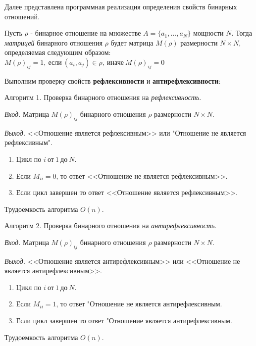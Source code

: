 \documentclass[bachelor, och, labwork]{shiza}
\begin{document}
Далее представлена программная реализация определения свойств бинарных 
отношений.

Пусть $\rho$ - бинарное отношение на множестве $A=\{a_1,...,a_N\}$ мощности $N$.
Тогда \textit{матрицей} бинарного отношения $\rho$ будет матрица $M(\rho)$ 
размерности $N \times N$, определяемая следующим образом: 
$M(\rho)_{ij}=1, ~\text{если}~ (a_i,a_j) \in \rho, ~\text{иначе}~ M(\rho)_{ij}=0$

Выполним проверку свойств \textbf{рефлексивности} и \textbf{антирефлексивности}:

Алгоритм 1. Проверка бинарного отношения на \textit{рефлексивность}.

\textit{Вход.} Матрица $M(\rho)_{ij}$ бинарного отношения $\rho$ размерности
$N \times N$.

\textit{Выход.} <<Отношение является рефлексивным>> или "Отношение не является 
рефлексивным".

\begin{enumerate}
        
    \item Цикл по $i ~\text{от}~ 1 ~\text{до}~ N$.

    \item Если $M_{ii} = 0$, то ответ <<Отношение не является рефлексивным>>. 

    \item Если цикл завершен то ответ <<Отношение является рефлексивным>>.
    
\end{enumerate}
Трудоемкость алгоритма $O(n)$.

Алгоритм 2. Проверка бинарного отношения на \textit{антирефлексивность}.

\textit{Вход.} Матрица $M(\rho)_{ij}$ бинарного отношения $\rho$ размерности
$N \times N$.

\textit{Выход.} <<Отношение является антирефлексивным>> или <<Отношение не является 
антирефлексивным>>.

\begin{enumerate}
        
    \item Цикл по $i ~\text{от}~ 1 ~\text{до}~ N$.

    \item Если $M_{ii} = 1$, то ответ "Отношение не является антирефлексивным. 

    \item Если цикл завершен то ответ "Отношение является антирефлексивным.
    
\end{enumerate}
Трудоемкость алгоритма $O(n)$.
\end{document}
